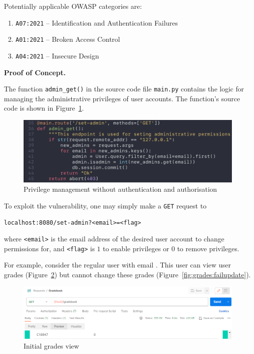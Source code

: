 \documentclass[parskip=half]{scrartcl}
\newcommand{\figref}[1]{Figure~\ref{#1}}
\begin{document}
Potentially applicable OWASP categories are:
\begin{enumerate}
  \item \texttt{A07:2021} -- Identification and Authentication Failures%
  \item \texttt{A01:2021} -- Broken Access Control%
  \item \texttt{A04:2021} -- Insecure Design%
\end{enumerate}

\textbf{Proof of Concept.}

The function \texttt{admin\_get()} in the source code file \texttt{main.py}
contains the logic for managing the administrative privileges of user accounts.
The function's source code is shown in \figref{fig:code:adminset}.

\begin{figure}
    \centering
    \includegraphics[width=\textwidth]{code_adminset}
    \caption{Privilege management without authentication and authorisation}
    \label{fig:code:adminset}
\end{figure}

To exploit the vulnerability, one may simply make a \texttt{GET} request to
\begin{verbatim}
localhost:8080/set-admin?<email>=<flag>
\end{verbatim}
where \texttt{<email>} is the email address of the desired user account to
change permissions for, and \texttt{<flag>} is $1$ to enable privileges or $0$
to remove privileges.

For example, consider the regular user with email \texttt{\email}. This user
can view user grades (\figref{fig:grades:view}) but cannot change these
grades (\figref{fig:grades:failupdate}).

\begin{figure}
    \centering
    \includegraphics[width=\textwidth]{view_grade}
    \caption{Initial grades view}
    \label{fig:grades:view}
\end{figure}
\end{document}
